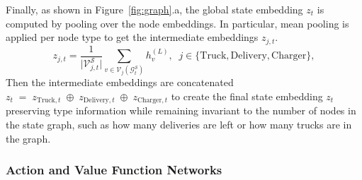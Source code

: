 \documentclass[journal]{IEEEtran}
\begin{document}
Finally, as shown in Figure~\ref{fig:graph}.a, the global state embedding $z_t$ is computed by pooling over the node embeddings. In particular, mean pooling is applied per node type to get the intermediate embeddings $z_{j,t}$.
\begin{equation}
z_{j,t}
=
\frac{1}{\lvert \mathcal{V}^{\mathcal{S}}_{j,t}\rvert}
\sum_{v\in \mathcal{V}_j(\mathcal{G}^{\mathcal{S}}_t)} h_v^{(L)},
\;\; j\in\{\mathrm{Truck},\mathrm{Delivery},\mathrm{Charger}\},
\label{eq:mean_pool_type}
\end{equation}
 Then the intermediate embeddings are concatenated
$z_t \;=\; z_{\mathrm{Truck},t} \;\oplus\; z_{\mathrm{Delivery},t} \;\oplus\; z_{\mathrm{Charger},t}$
to create the final state embedding $z_t$ preserving type information while remaining invariant to the number of nodes in the state graph, such as how many deliveries are left or how many trucks are in the graph.

\subsubsection{Action and Value Function Networks}
\end{document}
